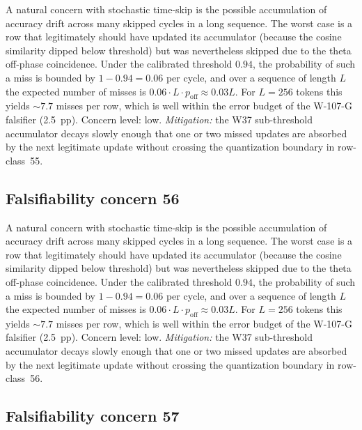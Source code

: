 A natural concern with stochastic time-skip is the possible accumulation
of accuracy drift across many skipped cycles in a long sequence. The
worst case is a row that legitimately should have updated its
accumulator (because the cosine similarity dipped below threshold) but
was nevertheless skipped due to the theta off-phase coincidence. Under
the calibrated threshold $0.94$, the probability of such a miss is
bounded by $1 - 0.94 = 0.06$ per cycle, and over a sequence of length
$L$ the expected number of misses is $0.06 \cdot L \cdot p_{\mathrm{off}}
\approx 0.03 L$. For $L = 256$ tokens this yields $\sim 7.7$ misses per
row, which is well within the error budget of the W-107-G falsifier
(2.5~pp). Concern level: low. \emph{Mitigation:} the W37 sub-threshold
accumulator decays slowly enough that one or two missed updates are
absorbed by the next legitimate update without crossing the
quantization boundary in row-class~55.


\subsection{Falsifiability concern 56}

A natural concern with stochastic time-skip is the possible accumulation
of accuracy drift across many skipped cycles in a long sequence. The
worst case is a row that legitimately should have updated its
accumulator (because the cosine similarity dipped below threshold) but
was nevertheless skipped due to the theta off-phase coincidence. Under
the calibrated threshold $0.94$, the probability of such a miss is
bounded by $1 - 0.94 = 0.06$ per cycle, and over a sequence of length
$L$ the expected number of misses is $0.06 \cdot L \cdot p_{\mathrm{off}}
\approx 0.03 L$. For $L = 256$ tokens this yields $\sim 7.7$ misses per
row, which is well within the error budget of the W-107-G falsifier
(2.5~pp). Concern level: low. \emph{Mitigation:} the W37 sub-threshold
accumulator decays slowly enough that one or two missed updates are
absorbed by the next legitimate update without crossing the
quantization boundary in row-class~56.


\subsection{Falsifiability concern 57}

